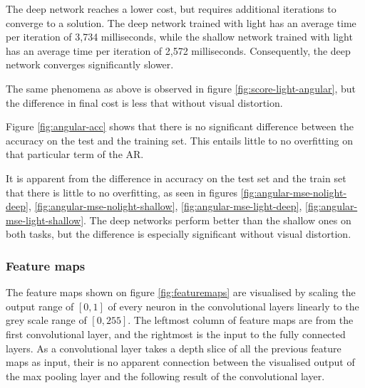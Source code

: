 

\noindent
The deep network reaches a lower cost, but requires additional iterations to converge to a solution. The deep network trained with light has an average time per iteration of 3,734 milliseconds, while the shallow network trained with light has an average time per iteration of 2,572 milliseconds. Consequently, the deep network converges significantly slower.



\noindent
The same phenomena as above is observed in figure \ref{fig:score-light-angular}, but the difference in final cost is less that without visual distortion.


\noindent
Figure \ref{fig:angular-acc} shows that there is no significant difference between the accuracy on the test and the training set. This entails little to no overfitting on that particular term of the AR.


It is apparent from the difference in accuracy on the test set and the train set that there is little to no overfitting, as seen in figures \ref{fig:angular-mse-nolight-deep}, \ref{fig:angular-mse-nolight-shallow}, \ref{fig:angular-mse-light-deep}, \ref{fig:angular-mse-light-shallow}. The deep networks perform better than the shallow ones on both tasks, but the difference is especially significant without visual distortion.





\subsubsection{Feature maps}
The feature maps shown on figure \ref{fig:featuremaps} are visualised by scaling the output range of $[0,1]$ of every neuron in the convolutional layers linearly to the grey scale range of $[0,255]$. The leftmost column of feature maps are from the first convolutional layer, and the rightmost is the input to the fully connected layers. As a convolutional layer takes a depth slice of all the previous feature maps as input, their is no apparent connection between the visualised output of the max pooling layer and the following result of the convolutional layer.

